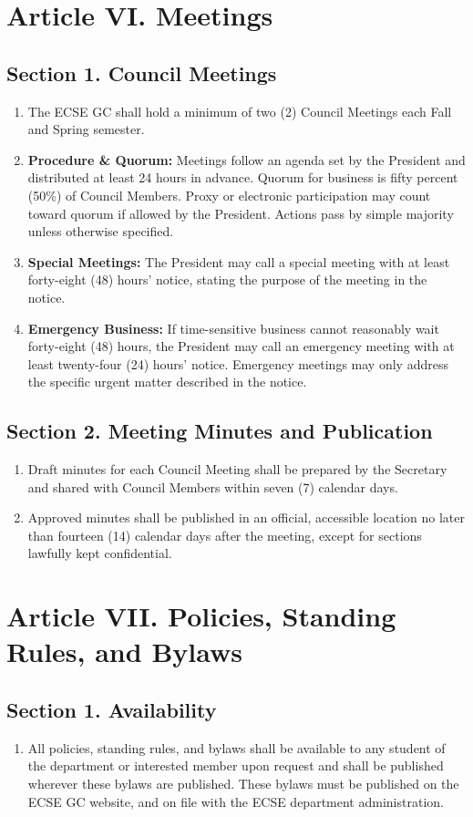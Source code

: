 \documentclass[11pt]{article}
\newcommand{\depname}{ECSE}
\newcommand{\orgshort}{ECSE GC}
\newcommand{\Article}[2]{\section*{Article #1. #2}}
\newcommand{\Sec}[1]{\subsection*{Section {#1}}}
\begin{document}
\Article{VI}{Meetings}

\Sec{1. Council Meetings}
\begin{enumerate}[label=\alph*)]
    \item The \orgshort{} shall hold a minimum of two (2) Council Meetings each Fall and Spring semester.
    \item \textbf{Procedure \& Quorum:} Meetings follow an agenda set by the President and distributed at least 24 hours in advance. Quorum for business is fifty percent (50\%) of Council Members. Proxy or electronic participation may count toward quorum if allowed by the President. Actions pass by simple majority unless otherwise specified.
    \item \textbf{Special Meetings:} The President may call a special meeting with at least forty-eight (48) hours' notice, stating the purpose of the meeting in the notice.
    \item \textbf{Emergency Business:} If time-sensitive business cannot reasonably wait forty-eight (48) hours, the President may call an emergency meeting with at least twenty-four (24) hours' notice. Emergency meetings may only address the specific urgent matter described in the notice.
\end{enumerate}

\Sec{2. Meeting Minutes and Publication}
\begin{enumerate}[label=\alph*)]
    \item Draft minutes for each Council Meeting shall be prepared by the Secretary and shared with Council Members within seven (7) calendar days.
    \item Approved minutes shall be published in an official, accessible location no later than fourteen (14) calendar days after the meeting, except for sections lawfully kept confidential.
\end{enumerate}

\Article{VII}{Policies, Standing Rules, and Bylaws}

\Sec{1. Availability}
\begin{enumerate}[label=\alph*)]
    \item All policies, standing rules, and bylaws shall be available to any student of the department or interested member upon request and shall be published wherever these bylaws are published. These bylaws must be published on the \orgshort{} website, and on file with the \depname{} department administration.
\end{enumerate}
\end{document}
